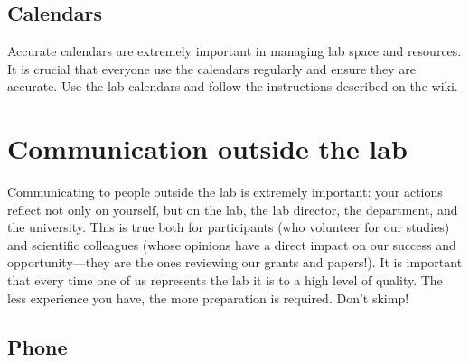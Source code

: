 \documentclass[letterpaper,12pt,oneside]{memoir}
\begin{document}
\subsection{Calendars}

Accurate calendars are extremely important in managing lab space and resources. It is crucial that everyone use the calendars regularly and ensure they are accurate. Use the lab calendars and follow the instructions described on the wiki.






\section{Communication outside the lab}

Communicating to people outside the lab is extremely important: your actions reflect not only on yourself, but on the lab, the lab director, the department, and the university. This is true both for participants (who volunteer for our studies) and scientific colleagues (whose opinions have a direct impact on our success and opportunity---they are the ones reviewing our grants and papers!). It is important that every time one of us represents the lab it is to a high level of quality. The less experience you have, the more preparation is required. Don't skimp!

\subsection{Phone}
\end{document}
